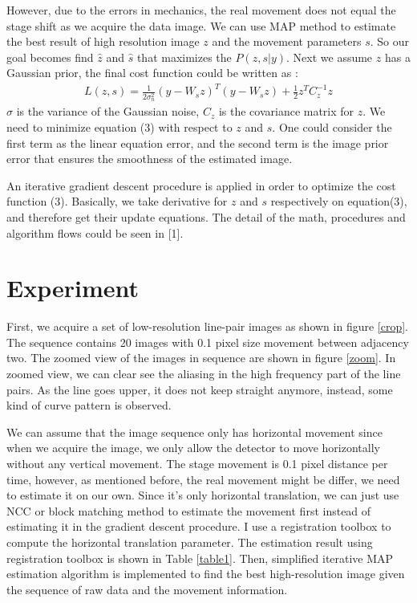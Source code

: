 \documentclass{article}
\begin{document}
However, due to the errors in mechanics, the real movement does not equal the stage shift as we acquire the data image. We can use MAP method to estimate the best result of high resolution image $z$ and the movement parameters $s$. So our goal becomes find $\hat{z}$ and $\hat{s}$ that maximizes the $P(z,s|y)$. Next we assume $z$ has a Gaussian prior, the final cost function could be written as : 
	\begin{align}
		L(z,s) = \frac{1}{2\sigma_n^2}(y-W_sz)^T(y-W_sz)+\frac{1}{2}z^TC_z^{-1}z
	\end{align}
$\sigma$ is the variance of the Gaussian noise, $C_z$ is the covariance matrix for $z$. We need to minimize equation (3) with respect to $z$ and $s$.  One could consider the first term as the linear equation error, and the second term is the image prior error that ensures the smoothness of the estimated image. 

An iterative gradient descent procedure is applied in order to optimize the cost function (3). Basically, we take derivative for $z$ and $s$ respectively on equation(3), and therefore get their update equations.  The detail of the math, procedures and algorithm flows could be seen in [1]. 

\section{Experiment}
First, we acquire a set of low-resolution line-pair images as shown in figure \ref{crop}. The sequence contains 20 images with 0.1 pixel size movement between adjacency two.  The zoomed view of the images in sequence are shown in figure \ref{zoom}. In zoomed view, we can clear see the aliasing in the high frequency part of the line pairs. As the line goes upper, it does not keep straight anymore, instead, some kind of curve pattern is observed. 

We can assume that the image sequence only has horizontal movement since when we acquire the image, we only allow the detector to move horizontally without any vertical movement. The stage movement is 0.1 pixel distance per time, however, as mentioned before, the real movement might be differ, we need to estimate it on our own. Since it's only horizontal translation, we can just use NCC or block matching method to estimate the movement first instead of estimating it in the gradient descent procedure. I use a registration toolbox to compute the horizontal translation parameter. The estimation result using registration toolbox is shown in Table \ref{table1}.  Then, simplified iterative MAP estimation algorithm is implemented to find the best high-resolution image given the sequence of raw data and the movement information. 
\end{document}
